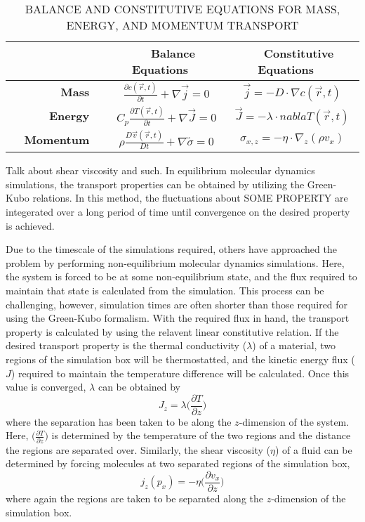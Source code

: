 \begin{longtable}{rcc}
	\caption{BALANCE AND CONSTITUTIVE EQUATIONS FOR MASS, ENERGY, AND MOMENTUM TRANSPORT}
	\label{tab:transport}
	\\\hline \hline
 	& \textbf{~~Balance Equations~~} & \textbf{~~Constitutive Equations~~}\\ \hline 
	\textbf{~~Mass~~} & $\frac{\partial c (\vec{r}, t)}{\partial t} + \nabla \vec{j} = 0$ & $\vec{j} = -D \cdot \nabla c(\vec{r}, t)$\\
	\textbf{~~Energy~~} & $C_p \frac{\partial T (\vec{r}, t)}{\partial t} + \nabla \vec{J} = 0$ & $\vec{J} = -\lambda \cdot nabla T(\vec{r}, t)$\\
	\textbf{~~Momentum~~} & $\rho \frac{D \vec{v}(\vec{r}, t)}{Dt} + \nabla \overleftrightarrow{\sigma} = 0$ & $\sigma_{x,z} = -\eta \cdot \nabla_z (\rho v_x)$\\ \hline \hline
\end{longtable}





Talk about shear viscosity and such.  In equilibrium molecular
dynamics simulations, the transport properties can be obtained by
utilizing the Green-Kubo relations. In this method, the fluctuations
about SOME PROPERTY are integerated over a long period of time until
convergence on the desired property is achieved. 

Due to the timescale of the simulations required, others have
approached the problem by performing non-equilibrium molecular
dynamics simulations. Here, the system is forced to be at some
non-equilibrium state, and the flux required to maintain that state is
calculated from the simulation. This process can be challenging,
however, simulation times are often shorter than those required for
using the Green-Kubo formalism. With the required flux in hand, the
transport property is calculated by using the relavent linear
constitutive relation. If the desired transport property is the
thermal conductivity ($\lambda$) of a material, two regions of the simulation box
will be thermostatted, and the kinetic energy flux ($J$) required to
maintain the temperature difference will be calculated. Once this
value is converged, $\lambda$ can be obtained by 
\begin{equation}\label{thermalTransport}
J_{z} = \lambda \big(\frac{\partial T}{\partial z}\big)
\end{equation}
where the separation has been taken to be along the $z$-dimension of
the system.  Here, $\big(\frac{\partial T}{\partial z}\big) $ is
determined by the temperature of the two regions and the distance the
regions are separated over. Similarly, the shear viscosity
($\eta$) of a fluid can be determined by forcing molecules at two
separated regions of the simulation box,
\begin{equation}\label{momentumTransport}
  j_{z}(p_{x}) = -\eta \big(\frac{\partial v_{x}}{\partial z}\big)
\end{equation}
where again the regions are taken to be separated along the
$z$-dimension of the simulation box.

